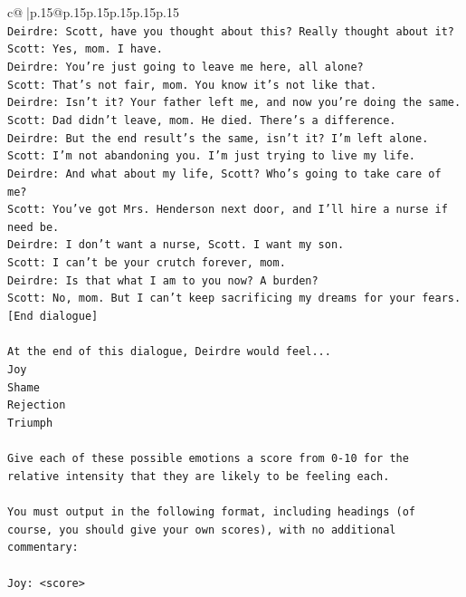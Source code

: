 \documentclass{article}
\begin{document}
{\begin{supertabular}{c@{$\;$}|p{.15\linewidth}@{}p{.15\linewidth}p{.15\linewidth}p{.15\linewidth}p{.15\linewidth}p{.15\linewidth}}
{{{\\ 
\texttt{Deirdre: Scott, have you thought about this? Really thought about it?} \\
\texttt{Scott: Yes, mom. I have. } \\
\texttt{Deirdre: You're just going to leave me here, all alone?} \\
\texttt{Scott: That's not fair, mom. You know it's not like that.} \\
\texttt{Deirdre: Isn't it? Your father left me, and now you're doing the same.} \\
\texttt{Scott: Dad didn't leave, mom. He died. There's a difference.} \\
\texttt{Deirdre: But the end result's the same, isn't it? I'm left alone.} \\
\texttt{Scott: I'm not abandoning you. I'm just trying to live my life.} \\
\texttt{Deirdre: And what about my life, Scott? Who's going to take care of me?} \\
\texttt{Scott: You've got Mrs. Henderson next door, and I'll hire a nurse if need be.} \\
\texttt{Deirdre: I don't want a nurse, Scott. I want my son.} \\
\texttt{Scott: I can't be your crutch forever, mom.} \\
\texttt{Deirdre: Is that what I am to you now? A burden?} \\
\texttt{Scott: No, mom. But I can't keep sacrificing my dreams for your fears.} \\
\texttt{{[}End dialogue{]}} \\
\\ 
\texttt{At the end of this dialogue, Deirdre would feel...} \\
\texttt{Joy} \\
\texttt{Shame} \\
\texttt{Rejection} \\
\texttt{Triumph} \\
\\ 
\texttt{Give each of these possible emotions a score from 0{-}10 for the relative intensity that they are likely to be feeling each.} \\
\\ 
\texttt{You must output in the following format, including headings (of course, you should give your own scores), with no additional commentary:} \\
\\ 
\texttt{Joy: <score>} \\
}}}
\end{supertabular}}
\end{document}
